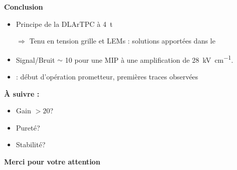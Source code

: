     {
        \begin{specialframe}
            \hspace*{-1.8cm}\parbox[t]{\textwidth}{
                        \centering \begin{Huge}
                        \vspace{2cm}
                        \textbf{Conclusion}
                        \vspace{1cm}
                        \end{Huge}
                        \begin{itemize}
                            \item Principe de la DLArTPC \textcolor{green}{\checkmark} à \SI{4}{\tonne}
                            \item[$\Rightarrow$] Tenu en tension grille et LEMs : solutions apportées dans le \SSS{}
                            \item Signal/Bruit $\sim$ 10 pour une MIP à une amplification de \SI{28}{\kilo\volt\per\centi\meter}.
                            \item \SSS{} : début d'opération prometteur, premières traces observées
                        \end{itemize}
                        \vspace{0.3cm}
                        \textbf{À suivre :}
                        \begin{itemize}
                            \item Gain $> 20$?
                            \item Pureté?
                            \item Stabilité?
                        \end{itemize}
                    }
        \end{specialframe}
    }
    {
        \begin{specialframe}
            \hspace*{-1.8cm}\parbox[t]{\textwidth}{
                        \centering \begin{Huge}
                        \vspace{1cm}
                        \textbf{Merci pour votre attention}
                        \end{Huge}
                    }
        \end{specialframe}
    }
    
